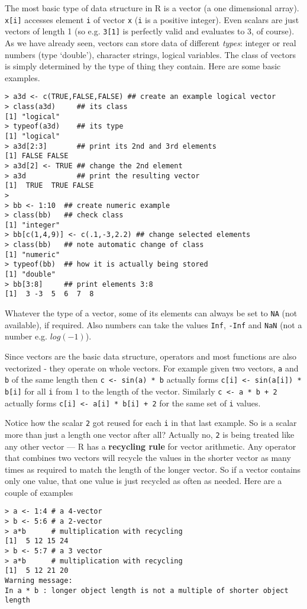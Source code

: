 \documentclass[10pt] {article}
\theoremstyle{definition}
\begin{document}
The most basic type of data structure in R is a vector (a one dimensional array). \lstinline+x[i]+ accesses element {\tt i} of vector {\tt x} ({\tt i} is a positive integer). Even scalars are just vectors of length 1 (so e.g. \lstinline+3[1]+ is perfectly valid and evaluates to 3, of course). As we have already seen, vectors can store data of different {\em types}: integer or real numbers (type `double'), character strings, logical variables. The class of vectors is simply determined by the type of thing they contain. Here are some basic examples. 
\begin{lstlisting}
> a3d <- c(TRUE,FALSE,FALSE) ## create an example logical vector
> class(a3d)     ## its class
[1] "logical"
> typeof(a3d)    ## its type
[1] "logical"
> a3d[2:3]       ## print its 2nd and 3rd elements 
[1] FALSE FALSE
> a3d[2] <- TRUE ## change the 2nd element
> a3d            ## print the resulting vector
[1]  TRUE  TRUE FALSE
> 
> bb <- 1:10  ## create numeric example
> class(bb)   ## check class
[1] "integer"
> bb[c(1,4,9)] <- c(.1,-3,2.2) ## change selected elements
> class(bb)   ## note automatic change of class 
[1] "numeric"
> typeof(bb)  ## how it is actually being stored
[1] "double"
> bb[3:8]     ## print elements 3:8 
[1]  3 -3  5  6  7  8
\end{lstlisting}
Whatever the type of a vector, some of its elements can always be set to {\tt NA} (not available), if required. Also numbers can take the values \verb+Inf+, \verb+-Inf+ and \verb+NaN+ (not a number e.g. $log(-1)$). 


Since vectors are the basic data structure, operators and most functions are also vectorized - they operate on whole vectors. For example given two vectors, {\tt a} and {\tt b} of the same length then \lstinline+c <- sin(a) * b+ actually forms \lstinline+c[i] <- sin(a[i]) * b[i]+ for all {\tt i} from 1 to the length of the vector. Similarly \lstinline^c <- a * b + 2^ actually forms \lstinline^c[i] <- a[i] * b[i] + 2^ for the same set of {\tt i} values. 

Notice how the scalar {\tt 2} got reused for each {\tt i} in that last example. So is a scalar more than just a length one vector after all? Actually no, {\tt 2} is being treated like any other vector --- R has a {\bf recycling rule} for vector arithmetic. Any operator that combines two vectors will recycle the values in the shorter vector as many times as required to match the length of the longer vector. So if a vector contains only one value, that one value is just recycled as often as needed. Here are a couple of examples   
\begin{lstlisting}
> a <- 1:4 # a 4-vector 
> b <- 5:6 # a 2-vector
> a*b      # multiplication with recycling
[1]  5 12 15 24
> b <- 5:7 # a 3 vector
> a*b      # multiplication with recycling
[1]  5 12 21 20
Warning message:
In a * b : longer object length is not a multiple of shorter object length
\end{lstlisting}
\end{document}
